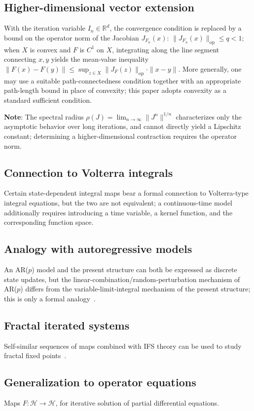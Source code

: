 \documentclass[11pt,a4paper]{amsart}
\begin{document}
\subsection{Higher-dimensional vector extension}
With the iteration variable $I_n \in \mathbb{R}^d$, the convergence condition is replaced by a bound on the operator norm of the Jacobian $J_{F_n}(x)$: $\|J_{F_n}(x)\|_{\mathrm{op}} \le q < 1$; when $X$ is convex and $F$ is $C^1$ on $X$, integrating along the line segment connecting $x,y$ yields the mean-value inequality $\|F(x) - F(y)\| \le \sup_{z\in X}\|J_F(z)\|_{\mathrm{op}} \cdot \|x - y\|$. More generally, one may use a suitable path-connectedness condition together with an appropriate path-length bound in place of convexity; this paper adopts convexity as a standard sufficient condition.

\textbf{Note}: The spectral radius $\rho(J) = \lim_{n\to\infty}\|J^n\|^{1/n}$ characterizes only the asymptotic behavior over long iterations, and cannot directly yield a Lipschitz constant; determining a higher-dimensional contraction requires the operator norm.

\subsection{Connection to Volterra integrals}
Certain state-dependent integral maps bear a formal connection to Volterra-type integral equations, but the two are not equivalent; a continuous-time model additionally requires introducing a time variable, a kernel function, and the corresponding function space.

\subsection{Analogy with autoregressive models}
An AR($p$) model and the present structure can both be expressed as discrete state updates, but the linear-combination/random-perturbation mechanism of AR($p$) differs from the variable-limit-integral mechanism of the present structure; this is only a formal analogy~\cite{elaydi2005}.

\subsection{Fractal iterated systems}
Self-similar sequences of maps combined with IFS theory can be used to study fractal fixed points~\cite{barnsley1988}.

\subsection{Generalization to operator equations}
Maps $F: \mathcal{H} \to \mathcal{H}$, for iterative solution of partial differential equations.
\end{document}
